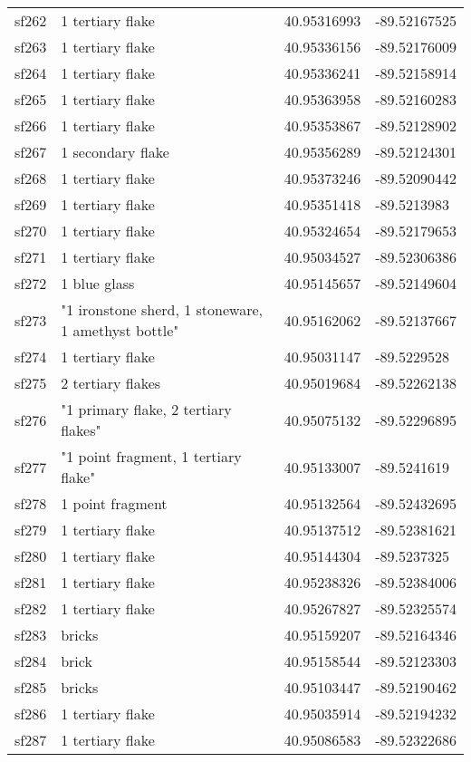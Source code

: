 \begin{longtable}{p{1cm}p{6cm}ll}
	sf262 & 1 tertiary flake & 40.95316993 & -89.52167525\\
	sf263 & 1 tertiary flake & 40.95336156 & -89.52176009\\
	sf264 & 1 tertiary flake & 40.95336241 & -89.52158914\\
	sf265 & 1 tertiary flake & 40.95363958 & -89.52160283\\
	sf266 & 1 tertiary flake & 40.95353867 & -89.52128902\\
	sf267 & 1 secondary flake & 40.95356289 & -89.52124301\\
	sf268 & 1 tertiary flake & 40.95373246 & -89.52090442\\
	sf269 & 1 tertiary flake & 40.95351418 & -89.5213983\\
	sf270 & 1 tertiary flake & 40.95324654 & -89.52179653\\
	sf271 & 1 tertiary flake & 40.95034527 & -89.52306386\\
	sf272 & 1 blue glass & 40.95145657 & -89.52149604\\
	sf273 & "1 ironstone sherd, 1 stoneware, 1 amethyst bottle" & 40.95162062 & -89.52137667\\
	sf274 & 1 tertiary flake & 40.95031147 & -89.5229528\\
	sf275 & 2 tertiary flakes & 40.95019684 & -89.52262138\\
	sf276 & "1 primary flake, 2 tertiary flakes" & 40.95075132 & -89.52296895\\
	sf277 & "1 point fragment, 1 tertiary flake" & 40.95133007 & -89.5241619\\
	sf278 & 1 point fragment & 40.95132564 & -89.52432695\\
	sf279 & 1 tertiary flake & 40.95137512 & -89.52381621\\
	sf280 & 1 tertiary flake & 40.95144304 & -89.5237325\\
	sf281 & 1 tertiary flake & 40.95238326 & -89.52384006\\
	sf282 & 1 tertiary flake & 40.95267827 & -89.52325574\\
	sf283 & bricks & 40.95159207 & -89.52164346\\
	sf284 & brick & 40.95158544 & -89.52123303\\
	sf285 & bricks & 40.95103447 & -89.52190462\\
	sf286 & 1 tertiary flake & 40.95035914 & -89.52194232\\
	sf287 & 1 tertiary flake & 40.95086583 & -89.52322686\\
\end{longtable}

